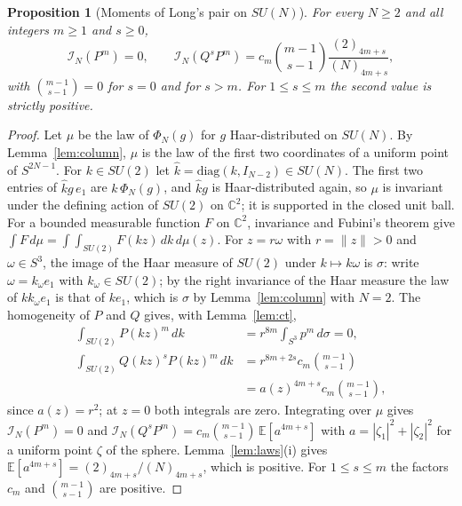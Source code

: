 \documentclass[11pt]{article}
\newtheorem{proposition}{Proposition}
\theoremstyle{remark}
\newcommand{\C}{\mathbb{C}}
\begin{document}
\begin{proposition}[Moments of Long's pair on $SU(N)$]\label{prop:longsun}
For every $N\ge2$ and all integers $m\ge1$ and $s\ge0$,
\begin{equation}\label{eq:moments}
\mathcal I_N(P^m)=0,\qquad \mathcal I_N(Q^sP^m)=c_m\binom{m-1}{s-1}\frac{(2)_{4m+s}}{(N)_{4m+s}},
\end{equation}
with $\binom{m-1}{s-1}=0$ for $s=0$ and for $s>m$. For $1\le s\le m$ the second value is strictly positive.
\end{proposition}
\begin{proof}
Let $\mu$ be the law of $\Phi_N(g)$ for $g$ Haar-distributed on $SU(N)$. By Lemma~\ref{lem:column}, $\mu$ is the law of the first two coordinates of a uniform point of $S^{2N-1}$. For $k\in SU(2)$ let $\hat k=\mathrm{diag}(k,I_{N-2})\in SU(N)$. The first two entries of $\hat kg\,e_1$ are $k\,\Phi_N(g)$, and $\hat kg$ is Haar-distributed again, so $\mu$ is invariant under the defining action of $SU(2)$ on $\C^2$; it is supported in the closed unit ball. For a bounded measurable function $F$ on $\C^2$, invariance and Fubini's theorem give $\int F\,d\mu=\int\int_{SU(2)}F(kz)\,dk\,d\mu(z)$. For $z=r\omega$ with $r=\|z\|>0$ and $\omega\in S^3$, the image of the Haar measure of $SU(2)$ under $k\mapsto k\omega$ is $\sigma$: write $\omega=k_\omega e_1$ with $k_\omega\in SU(2)$; by the right invariance of the Haar measure the law of $kk_\omega e_1$ is that of $ke_1$, which is $\sigma$ by Lemma~\ref{lem:column} with $N=2$. The homogeneity of $P$ and $Q$ gives, with Lemma~\ref{lem:ct},
\begin{align*}
\int_{SU(2)}P(kz)^m\,dk&=r^{8m}\int_{S^3}p^m\,d\sigma=0,\\
\int_{SU(2)}Q(kz)^sP(kz)^m\,dk&=r^{8m+2s}c_m\binom{m-1}{s-1}\\
&=a(z)^{4m+s}c_m\binom{m-1}{s-1},
\end{align*}
since $a(z)=r^2$; at $z=0$ both integrals are zero. Integrating over $\mu$ gives $\mathcal I_N(P^m)=0$ and $\mathcal I_N(Q^sP^m)=c_m\binom{m-1}{s-1}\,\mathbb E[a^{4m+s}]$ with $a=|\zeta_1|^2+|\zeta_2|^2$ for a uniform point $\zeta$ of the sphere. Lemma~\ref{lem:laws}(i) gives $\mathbb E[a^{4m+s}]=(2)_{4m+s}/(N)_{4m+s}$, which is positive. For $1\le s\le m$ the factors $c_m$ and $\binom{m-1}{s-1}$ are positive. \qedhere
\end{proof}
\end{document}
